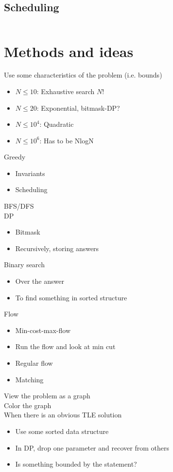 \documentclass[8pt,a4paper,landscape,oneside]{amsart}
\newcommand{\codec}[1]{\inputminted[fontsize=\large,tabsize=2,baselinestretch=1]{cpp}{code/#1}}
\begin{document}
\begin{multicols*}{2}
\begin{large}
\subsection{Scheduling}
\codec{scheduling.cpp}
\renewcommand{\labelitemi}{\textendash}
\newpage
\section{Methods and ideas}
\noindent
Use some characteristics of the problem (i.e. bounds)
\begin{itemize}
  \item $N\leq10$: Exhaustive search $N!$
  \item $N\leq20$: Exponential, bitmask-DP?
  \item $N\leq 10^4$: Quadratic
  \item $N\leq 10^6$: Has to be NlogN
\end{itemize}
Greedy
\begin{itemize}
  \item Invariants
  \item Scheduling
\end{itemize}
BFS/DFS\\
DP
\begin{itemize}
  \item Bitmask
  \item Recursively, storing answers
\end{itemize}
Binary search
\begin{itemize}
  \item Over the answer
  \item To find something in sorted structure
\end{itemize}
Flow
\begin{itemize}
  \item Min-cost-max-flow
  \item Run the flow and look at min cut
  \item Regular flow
  \item Matching
\end{itemize}
View the problem as a graph\\
Color the graph\\
When there is an obvious TLE solution
\begin{itemize}
  \item Use some sorted data structure
  \item In DP, drop one parameter and recover from others
  \item Is something bounded by the statement?

\end{itemize}
\end{large}
\end{multicols*}
\end{document}
